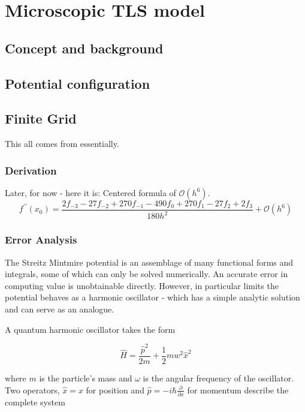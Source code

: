 \chapter{Microscopic TLS model}
\section{Concept and background}
\section{Potential configuration}

\section{Finite Grid}

This all comes from \cite{Mathews2004} essentially.

\subsection{Derivation}

Later, for now - here it is: Centered formula of $\mathcal{O}(h^{6})$.
\begin{equation}
f^{\prime\prime}(x_0)=\frac{2f_{-3}-27f_{-2}+270f_{-1}-490f_{0}+270f_{1}-27f_{2}+2f_{3}}{180h^{2}}+\mathcal{O}(h^{6})
\end{equation}

\subsection{Error Analysis}
The Streitz Mintmire potential \cite{Streitz1994} is an assemblage of many functional forms and integrals, some of which can only be solved numerically. An accurate error in computing value is unobtainable directly. However, in particular limits the potential behaves as a harmonic oscillator - which has a simple analytic solution and can serve as an analogue.

A quantum harmonic oscillator takes the form

\begin{equation}
\hat{H} = \frac{\hat{p}^2}{2m}+\frac{1}{2}mw^2\hat{x}^2
\end{equation}

where $m$ is the particle's mass and $ω$ is the angular frequency of the oscillator. Two operators, $\hat{x} = x$ for position and $\hat{p} = -i\hbar \frac{\partial}{\partial x}$ for momentum describe the complete system 
 
